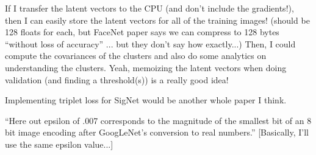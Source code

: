If I transfer the latent vectors to the CPU (and don't include the gradients!), then I can easily store the latent vectors for all of the training images!
(should be 128 floats for each, but FaceNet paper says we can compress to 128 bytes ``without loss of accuracy'' ... but they don't say how exactly...)
Then, I could compute the covariances of the clusters and also do some analytics on understanding the clusters.
Yeah, memoizing the latent vectors when doing validation (and finding a threshold(s)) is a really good idea!

Implementing triplet loss for SigNet would be another whole paper I think.

``Here out epsilon of .007 corresponds to the magnitude of the
smallest bit of an 8 bit image encoding after GoogLeNet's conversion to real numbers.''\cite{goodfellow}
[Basically, I'll use the same epsilon value...]
